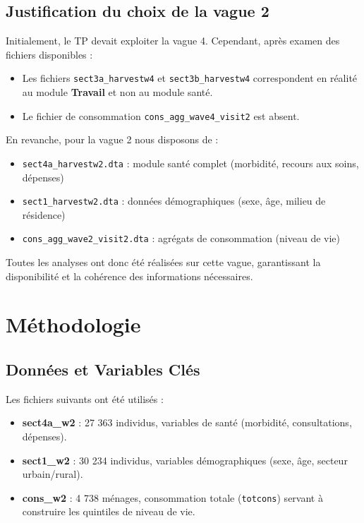 \documentclass[
  11pt,
]{article}
\begin{document}
\subsection{Justification du choix de la vague
2}\label{justification-du-choix-de-la-vague-2}

Initialement, le TP devait exploiter la vague 4. Cependant, après examen
des fichiers disponibles :

\begin{itemize}
\item
  Les fichiers \texttt{sect3a\_harvestw4} et \texttt{sect3b\_harvestw4}
  correspondent en réalité au module \textbf{Travail} et non au module
  santé.
\item
  Le fichier de consommation \texttt{cons\_agg\_wave4\_visit2} est
  absent.
\end{itemize}

En revanche, pour la vague 2 nous disposons de :

\begin{itemize}
\item
  \texttt{sect4a\_harvestw2.dta} : module santé complet (morbidité,
  recours aux soins, dépenses)
\item
  \texttt{sect1\_harvestw2.dta} : données démographiques (sexe, âge,
  milieu de résidence)
\item
  \texttt{cons\_agg\_wave2\_visit2.dta} : agrégats de consommation
  (niveau de vie)
\end{itemize}

Toutes les analyses ont donc été réalisées sur cette vague, garantissant
la disponibilité et la cohérence des informations nécessaires.

\section{Méthodologie}\label{muxe9thodologie}

\subsection{Données et Variables
Clés}\label{donnuxe9es-et-variables-cluxe9s}

Les fichiers suivants ont été utilisés :

\begin{itemize}
\item
  \textbf{sect4a\_w2} : 27 363 individus, variables de santé (morbidité,
  consultations, dépenses).
\item
  \textbf{sect1\_w2} : 30 234 individus, variables démographiques (sexe,
  âge, secteur urbain/rural).
\item
  \textbf{cons\_w2} : 4 738 ménages, consommation totale
  (\texttt{totcons}) servant à construire les quintiles de niveau de
  vie.
\end{itemize}
\end{document}
